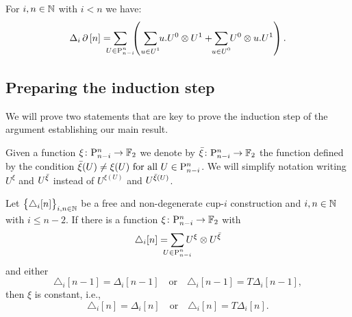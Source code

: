 \begin{proposition} \label{p:fact}
	For $i,n \in \mathbb{N}$ with $i < n$ we have:
	\[
	\Delta_i \bd \, [n] =
	\sum_{\mathclap{U \in \P_{n-i}^n}} \
	\left(\
	\sum_{\mathclap{u \in U^1}} u.U^0 \ot U^1 +
	\sum_{\mathclap{u \in U^0}} U^0 \ot u.U^1
	\right).
	\]
\end{proposition}

\subsection{Preparing the induction step} \label{ss:preparing}

We will prove two statements that are key to prove the induction step of the argument establishing our main result.

\begin{notation*}
	Given a function $\xi \colon \mathrm{P}_{n-i}^n \to {\mathbb{F}_2}$ we denote by ${\bar{\xi}} \colon \mathrm{P}_{n-i}^n \to {\mathbb{F}_2}$ the function defined by the condition ${\bar{\xi}}(U) \neq \xi(U) \text{ for all } U \in \mathrm{P}_{n-i}^n$.
	We will simplify notation writing $U^\xi$ and $U^{{\bar{\xi}}}$ instead of $U^{\xi(U)}$ and $U^{{\bar{\xi}}(U)}$.
\end{notation*}

\begin{lemma} \label{l:first nail}
	Let $\big\{ \triangle_i [n] \big\}_{i,n\in\mathbb{N}}$ be a free and non-degenerate \mbox{cup-$i$} construction and $i,n \in \mathbb{N}$ with $i \leq n-2$.
	If there is a function $\xi \colon \mathrm{P}_{n-i}^n \to {\mathbb{F}_2}$ with
	\begin{equation} \label{e:xi and barxi}
	\triangle_i [n] =
	\sum_{\mathclap{U \in \P_{n-i}^n}} U^{\xi} \ot U^{\barxi}
	\end{equation}
	and either
	\[
	\triangle_i [n-1] = \Delta_i [n-1]
	\quad \text{or} \quad
	\triangle_i [n-1] = T\Delta_i [n-1],
	\]
	then $\xi$ is constant, i.e.,
	\[
	\triangle_i [n] = \Delta_i [n]
	\quad \text{or} \quad
	\triangle_i [n] = T \Delta_i [n].
	\]
\end{lemma}

